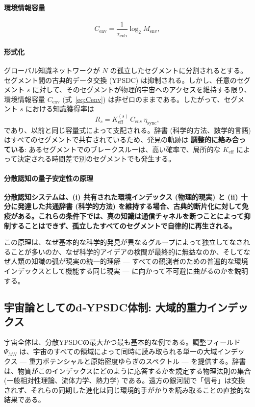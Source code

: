 \documentclass[11pt,a4paper]{article}
\begin{document}
	\paragraph{環境情報容量}
	\[
	C_{\mathrm{env}} = \frac{1}{\tau_{\mathrm{coh}}} \log_2 M_{\mathrm{env}},
	\label{eq:Cenv}
	\]
	
	\paragraph*{形式化}
	グローバル知識ネットワークが $N$ の孤立したセグメントに分割されるとする。セグメント間の古典的データ交換 (YPSDC) は抑制される。しかし、任意のセグメント $s$ に対して、そのセグメントが物理的宇宙へのアクセスを維持する限り、環境情報容量 $C_{\mathrm{env}}$ (式~\ref{eq:Cenv}) は非ゼロのままである。したがって、セグメント $s$ における知識獲得率は
	\[
	R_s = K_{\mathrm{eff}}^{(s)} \, C_{\mathrm{env}} \, \eta_{\mathrm{sync}},
	\]
	であり、以前と同じ容量式によって支配される。辞書 (科学的方法、数学的言語) はすべてのセグメントで共有されているため、発見の軌跡は \textbf{調整的に絡み合っている}: あるセグメントでのブレークスルーは、高い確率で、局所的な $K_{\mathrm{eff}}$ によって決定される時間差で別のセグメントでも発生する。
	
	\paragraph*{分散認知の量子安定性の原理}
	\textbf{分散認知システムは、(i) 共有された環境インデックス (物理的現実) と (ii) 十分に発達した共通辞書 (科学的方法) を維持する場合、古典的断片化に対して免疫がある。これらの条件下では、真の知識は通信チャネルを断つことによって抑制することはできず、孤立したすべてのセグメントで自律的に再生される。}
	
	この原理は、なぜ基本的な科学的発見が異なるグループによって独立してなされることが多いのか、なぜ科学的アイデアの検閲が最終的に無益なのか、そしてなぜ人類の知識の弧が現実の統一的理解 — すべての観測者のための普遍的な環境インデックスとして機能する同じ現実 — に向かって不可避に曲がるのかを説明する。
	
	\subsection{宇宙論としてのd‑YPSDC体制: 大域的重力インデックス}
	\label{subsec:cosmology-dypsdc}
	
	宇宙全体は、分散YPSDCの最大かつ最も基本的な例である。調整フィールド $\Psi_{MN}$ は、宇宙のすべての領域によって同時に読み取られる単一の大域インデックス — 重力ポテンシャルと原始密度ゆらぎのスペクトル — を提供する。辞書は、物質がこのインデックスにどのように応答するかを規定する物理法則の集合 (一般相対性理論、流体力学、熱力学) である。遠方の銀河間で「信号」は交換されず、それらの同期した進化は同じ環境的手がかりを読み取ることの直接的な結果である。
	
\end{document}
